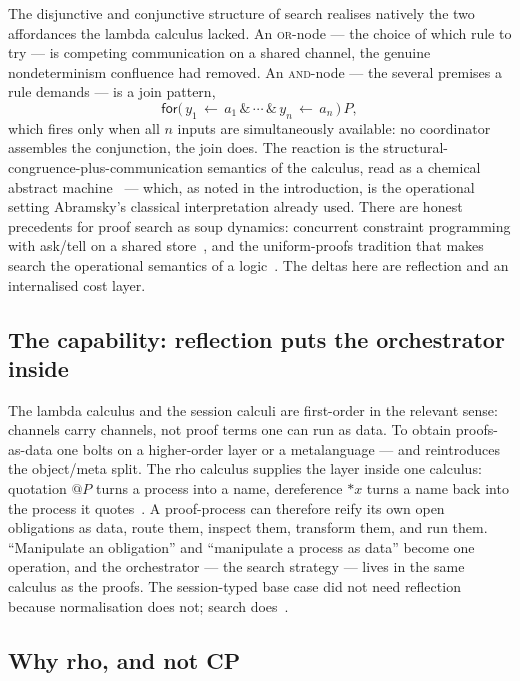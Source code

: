 \documentclass[11pt]{article}
\theoremstyle{definition}
\theoremstyle{plain}
\newcommand{\given}{\,\leftarrow\,}
\begin{document}
The disjunctive and conjunctive structure of search realises natively the two
affordances the lambda calculus lacked. An \textsc{or}-node --- the choice of
which rule to try --- is competing communication on a shared channel, the genuine
nondeterminism confluence had removed. An \textsc{and}-node --- the several
premises a rule demands --- is a join pattern,
\[
  \mathsf{for}\big(\,y_1 \given a_1 \,\&\, \cdots \,\&\, y_n \given a_n\,\big)\,P,
\]
which fires only when all $n$ inputs are simultaneously available: no coordinator
assembles the conjunction, the join does. The reaction is the
structural-congruence-plus-communication semantics of the calculus, read as a
chemical abstract machine~\cite{BerryBoudol92,Meseguer92} --- which, as noted in
the introduction, is the operational setting Abramsky's classical interpretation
already used. There are honest precedents for proof search as soup dynamics:
concurrent constraint programming with ask/tell on a shared
store~\cite{Saraswat91}, and the uniform-proofs tradition that makes search the
operational semantics of a logic~\cite{MillerEtAl91}. The deltas here are
reflection and an internalised cost layer.

\subsection{The capability: reflection puts the orchestrator inside}

The lambda calculus and the session calculi are first-order in the relevant
sense: channels carry channels, not proof terms one can run as data. To obtain
proofs-as-data one bolts on a higher-order layer or a metalanguage --- and
reintroduces the object/meta split. The rho calculus supplies the layer inside
one calculus: quotation $@P$ turns a process into a name, dereference $*x$ turns
a name back into the process it quotes~\cite{MeredithRadestock05}. A
proof-process can therefore reify its own open obligations as data, route them,
inspect them, transform them, and run them. ``Manipulate an obligation'' and
``manipulate a process as data'' become one operation, and the orchestrator ---
the search strategy --- lives in the same calculus as the proofs. The
session-typed base case did not need reflection because normalisation does not;
search does~\cite{NoteIV}.

\subsection{Why rho, and not CP}
\end{document}
